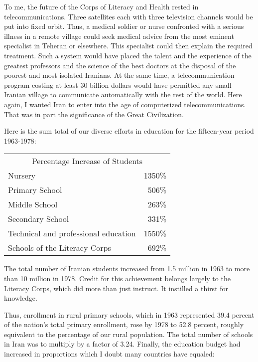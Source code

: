 To me, the future of the Corps of Literacy and Health rested in telecommunications. Three satellites each with three television channels would be put into fixed orbit. Thus, a medical soldier or nurse confronted with a serious illness in a remote village could seek medical advice from the most eminent specialist in Teheran or elsewhere. This specialist could then explain the required treatment. Such a system would have placed the talent and the experience of the greatest professors and the science of the best doctors at the disposal of the poorest and most isolated Iranians. At the same time, a telecommunication program costing at least 30 billion dollars would have permitted any small Iranian village to communicate automatically with the rest of the world. Here again, I wanted Iran to enter into the age of computerized telecommunications. That was in part the significance of the Great Civilization. 


Here is the sum total of our diverse efforts in education for the 
fifteen-year period 1963-1978: 
\begin{center}
    \begin{tabular}{lr}
    \multicolumn{2}{c}{Percentage Increase of Students } \\
    Nursery & 1350\% \\
    Primary School & 506\% \\
    Middle School & 263\% \\
    Secondary School & 331\% \\
    Technical and professional education & 1550\% \\
    Schools of the Literacy Corps & 692\% \\
    \end{tabular}%
\end{center}


The total number of Iranian students increased from 1.5 million in 1963 to more than 10 million in 1978. Credit for this achievement belongs largely to the Literacy Corps, which did more than just instruct. It instilled a thirst for knowledge. 

Thus, enrollment in rural primary schools, which in 1963 represented 39.4 percent of the nation’s total primary enrollment, rose by 1978 to 52.8 percent, roughly equivalent to the percentage of our rural population. The total number of schools in Iran was to multiply by a factor of 3.24. Finally, the education budget had increased in proportions which I doubt many countries have equaled: 

